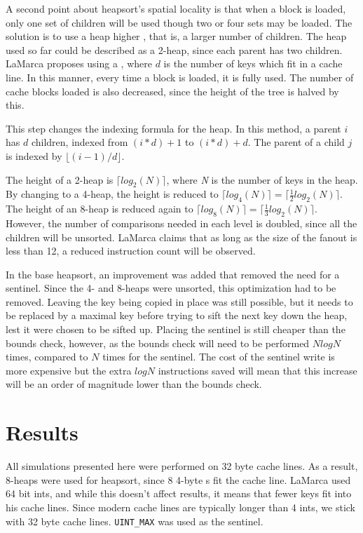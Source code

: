 A second point about heapsort's spatial locality is that when a block is loaded,
only one set of children will be used though two or four sets may be loaded. The
solution is to use a heap higher , that is, a larger number of
children.  The heap used so far could be described as a 2-heap, since each
parent has two children.  LaMarca proposes using a , where $d$ is the
number of keys which fit in a cache line. In this manner, every time a block is
loaded, it is fully used. The number of cache blocks loaded is also decreased,
since the height of the tree is halved by this.

This step changes the indexing formula for the heap. In this method, a parent
$i$ has $d$ children, indexed from $(i*d) + 1$ to $(i*d) + d$. The parent of a
child $j$ is indexed by $\lfloor{}(i-1)/d\rfloor{}$.

The height of a 2-heap is $\lceil{}log_2(N)\rceil{}$, where \textit{N} is the
number of keys in the heap. By changing to a 4-heap, the height is reduced to
$\lceil{}log_4(N)\rceil{} = \lceil{}\tfrac{1}{2}log_2(N)\rceil{}$. The height of
an 8-heap is reduced again to $\lceil{}log_8(N)\rceil{} =
\lceil{}\tfrac{1}{3}log_2(N)\rceil{}$. However, the number of comparisons needed
in each level is doubled, since all the children will be unsorted. LaMarca
claims that as long as the size of the fanout is less than 12, a reduced
instruction count will be observed.

In the base heapsort, an improvement was added that removed the need for a
sentinel. Since the 4- and 8-heaps were unsorted, this optimization had to be
removed. Leaving the key being copied in place was still possible, but it needs
to be replaced by a maximal key before trying to sift the next key down the
heap, lest it were chosen to be sifted up. Placing the sentinel is still cheaper
than the bounds check, however, as the bounds check will need to be performed
$NlogN$ times, compared to $N$ times for the sentinel. The cost of the sentinel
write is more expensive but the extra $logN$ instructions saved will mean that
this increase will be an order of magnitude lower than the bounds check.

\section{Results}
All simulations presented here were performed on 32 byte cache lines. As a
result, 8-heaps were used for heapsort, since 8 4-byte s fit the cache line.
LaMarca used 64 bit ints, and while this doesn't affect results, it means that
fewer keys fit into his cache lines. Since modern cache lines are typically
longer than 4 ints, we stick with 32 byte cache lines. \verb!UINT_MAX! was used
as the sentinel.

